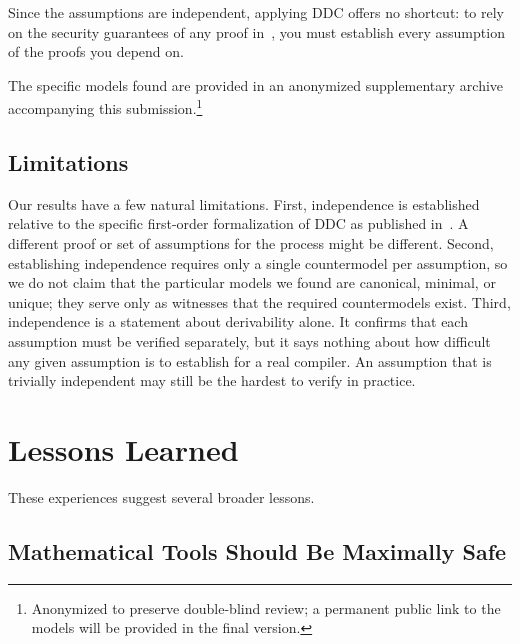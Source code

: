 Since the assumptions are independent, applying DDC offers no shortcut: to rely on the security guarantees of any proof in~\cite{wheeler2010ddc}, you must establish every assumption of the proofs you depend on.

The specific models found are provided in an anonymized supplementary archive
accompanying this submission.\footnote{Anonymized to preserve double-blind
review; a permanent public link to the models will be provided in the final
version.}

\subsection{Limitations}

Our results have a few natural limitations. First, independence is established relative to the specific first-order formalization of DDC as published in~\cite{wheeler2010ddc}. A different proof or set of assumptions for the process might be different. Second, establishing independence requires only a single countermodel per assumption, so we do not claim that the particular models we found are canonical, minimal, or unique; they serve only as witnesses that the required countermodels exist. Third, independence is a statement about derivability alone. It confirms that each assumption must be verified separately, but it says nothing about how difficult any given assumption is to establish for a real compiler. An assumption that is trivially independent may still be the hardest to verify in practice.

\section{Lessons Learned}
\label{sec:lessons}

These experiences suggest several broader lessons.

\subsection{Mathematical Tools Should Be Maximally Safe}

